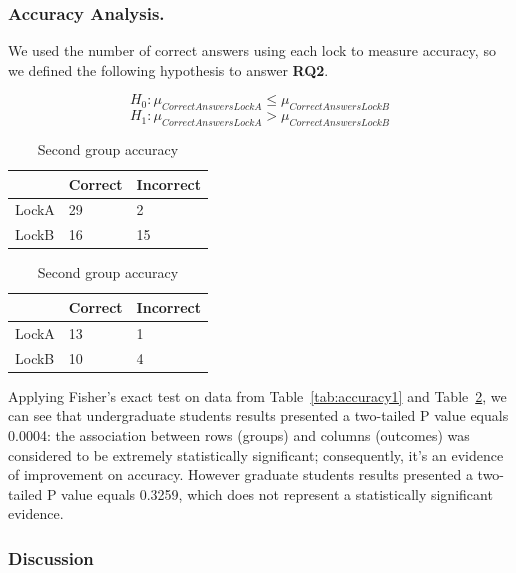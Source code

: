 \subsubsection{Accuracy Analysis.}

We used the number of correct answers using each lock to measure accuracy, so we defined the following hypothesis to answer {\bf RQ2}. 

\begin{equation}
  H_{0} : \mu_{CorrectAnswersLockA} \leq \mu_{CorrectAnswersLockB}
\end{equation}
\begin{equation}
  H_{1} : \mu_{CorrectAnswersLockA} > \mu_{CorrectAnswersLockB}
\end{equation}

\begin{table}
\parbox{.45\linewidth}{
\centering
\begin{tabular}{|l|l|l|}
\hline
 & Correct & Incorrect\\
\hline
LockA & 29 & 2\\
LockB & 16 & 15\\
\hline
\end{tabular}
\caption{First group accuracy}\label{tab:accuracy1}
}
\hfill
\parbox{.45\linewidth}{
\centering
\begin{tabular}{|l|l|l|}
\hline
 & Correct & Incorrect\\
\hline
LockA & 13 & 1\\
LockB & 10 & 4\\
\hline
\end{tabular}
\caption{Second group accuracy}\label{tab:accuracy2}
}
\end{table}

Applying Fisher's exact test on data from Table~\ref{tab:accuracy1} and Table~\ref{tab:accuracy2}, we can see that undergraduate students results presented a two-tailed P value equals 0.0004: the association between rows (groups) and columns (outcomes) was considered to be extremely statistically significant; consequently, it's an evidence of improvement on accuracy. However graduate students results presented a two-tailed P value equals 0.3259, which does not represent a statistically significant evidence.


\subsubsection{Discussion}

